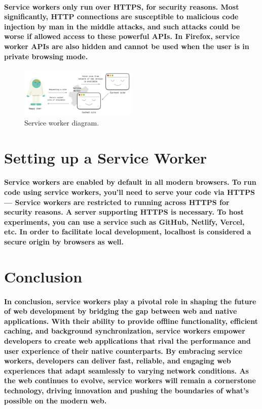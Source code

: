 \documentclass[12pt,a4paper]{article}
\begin{document}
    \paragraph{Service workers only run over HTTPS, for security reasons. Most significantly, HTTP
    connections are susceptible to malicious code injection by man in the middle attacks,
    and such attacks could be worse if allowed access to these powerful APIs. In Firefox,
    service worker APIs are also hidden and cannot be used when the user is in private
    browsing mode.}

    \begin{figure}[h!]
      \centering
      \includegraphics[width=0.5\textwidth]{cache.png}
      \caption{Service worker diagram.}
    \end{figure}

    \section{Setting up a Service Worker}

    \paragraph{Service workers are enabled by default in all modern browsers. To run code
    using service workers, you'll need to serve your code via HTTPS — Service workers
    are restricted to running across HTTPS for security reasons. A server supporting
    HTTPS is necessary. To host experiments, you can use a service such as GitHub,
    Netlify, Vercel, etc. In order to facilitate local development, localhost is considered a
    secure origin by browsers as well.}

    \clearpage

    \section{Conclusion}

    \paragraph{In conclusion, service workers play a pivotal role in shaping the future of web
    development by bridging the gap between web and native applications. With their
    ability to provide offline functionality, efficient caching, and background
    synchronization, service workers empower developers to create web applications that
    rival the performance and user experience of their native counterparts. By embracing
    service workers, developers can deliver fast, reliable, and engaging web experiences
    that adapt seamlessly to varying network conditions. As the web continues to evolve,
    service workers will remain a cornerstone technology, driving innovation and pushing
    the boundaries of what's possible on the modern web.}
\end{document}
